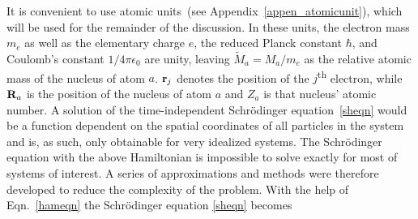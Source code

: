 It is convenient to use atomic units~(see Appendix~\ref{appen_atomicunit}), which will be used for the remainder of the discussion. In these units, the electron mass $m_e$ as well as the elementary charge $e$, the reduced Planck constant $\hbar$, and Coulomb's constant $1/4\pi\epsilon_0$ are unity, leaving $\tilde{M}_a = M_a/m_e$ as the relative atomic mass of the nucleus of atom $a$. $\vb{r}_j$ denotes the position of the $j$\textsuperscript{th} electron, while $\vb{R}_a$ is the position of the nucleus of atom $a$ and $Z_a$ is that nucleus' atomic number. A solution of the time-independent Schr\"odinger equation~\eqref{sheqn} would be a function dependent on the spatial coordinates of all particles in the system and is, as such, only obtainable for very idealized systems. The Schr\"odinger equation with the above Hamiltonian is impossible to solve exactly for most of systems of interest. A series of approximations and methods were therefore developed to reduce the complexity of the problem. With the help of Eqn.~\eqref{hameqn} the Schr\"odinger equation \eqref{sheqn} becomes 

